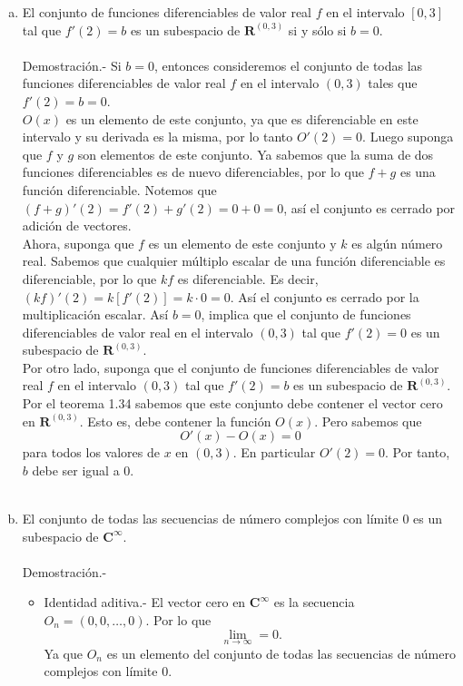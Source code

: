 \begin{enumerate}[\bfseries 1.]
\begin{enumerate}[(a)]
	    \item El conjunto de funciones diferenciables de valor real $f$ en el intervalo $[0,3]$ tal que $f'(2)=b$ es un subespacio de $\textbf{R}^{(0,3)}$ si y sólo si $b=0$.\\\\
		Demostración.-\; Si $b=0$, entonces consideremos el conjunto de todas las funciones diferenciables de valor real $f$ en el intervalo $(0,3)$ tales que $f'(2)=b=0$.\\
		$O(x)$ es un elemento de este conjunto, ya que es diferenciable en este intervalo y su derivada es la misma, por lo tanto $O'(2)=0$. Luego suponga que $f$ y $g$ son elementos de este conjunto. Ya sabemos que la suma de dos funciones diferenciables es de nuevo diferenciables, por lo que $f+g$ es una función diferenciable. Notemos que $(f+g)'(2)=f'(2)+g'(2)=0+0=0$, así el conjunto es cerrado por adición de vectores.\\
		Ahora, suponga que $f$ es un elemento de este conjunto y $k$ es algún número real. Sabemos que cualquier múltiplo escalar de una función diferenciable es diferenciable, por lo que $kf$ es diferenciable. Es decir, $(kf)'(2)=k\left[f'(2)\right]=k\cdot 0 = 0.$ Así el conjunto es cerrado por la multiplicación escalar. Así $b=0$, implica que el conjunto de funciones diferenciables de valor real en el intervalo $(0,3)$ tal que $f'(2)=0$ es un subespacio de $\textbf{R}^{(0,3)}$.\\
		Por otro lado, suponga que el conjunto de funciones diferenciables de valor real $f$ en el intervalo $(0,3)$ tal que $f'(2)=b$ es un subespacio de $\textbf{R}^{(0,3)}$. Por el teorema 1.34 sabemos que este conjunto debe contener el vector cero en $\textbf{R}^{(0,3)}$. Esto es, debe contener la función $O(x)$. Pero sabemos que
		$$O'(x)-O(x)=0$$
		para todos los valores de $x$ en $(0,3)$. En particular $O'(2)=0$. Por tanto, $b$ debe ser igual a $0$.\\\\

	    \item El conjunto de todas las secuencias de número complejos con límite $0$ es un subespacio de $\textbf{C}^{\infty}$.\\\\
		Demostración.-\;
		\begin{itemize}
		    \item Identidad aditiva.-\; El vector cero en $\textbf{C}^{\infty}$ es la secuencia $O_n=(0,0,\ldots,0)$. Por lo que
			$$\lim_{n\to \infty}=0.$$
		    Ya que $O_n$ es un elemento del conjunto de todas las secuencias de número complejos con límite $0$.


\end{itemize}
\end{enumerate}
\end{enumerate}
